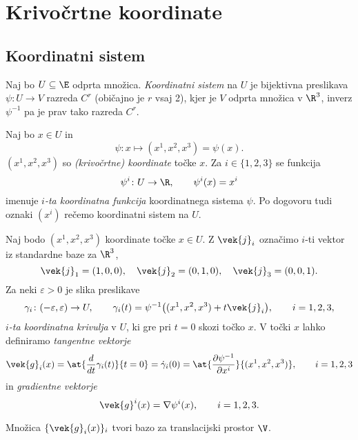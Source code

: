 \section{Krivočrtne koordinate} \label{s:koordinate}


\subsection{Koordinatni sistem}


\begin{definicija}
	Naj bo $U\subseteq\E$ odprta množica. \emph{Koordinatni sistem} na $U$ je bijektivna
	preslikava $\psi\colon U\to V$ razreda $C^r$ (običajno je $r$ vsaj 2), kjer je $V$ odprta
	množica v $\R^3$, inverz $\psi^{-1}$ pa je prav tako razreda $C^r$.
\end{definicija}

Naj bo $x\in U$ in
\[ \psi\colon x\mapsto (x^1,x^2,x^3)=\psi(x). \]
$(x^1,x^2,x^3)$ so \emph{(krivočrtne) koordinate} točke $x$.
Za $i\in\{1,2,3\}$ se funkcija
\[ \psi^i\colon U\to\R,\qquad \psi^i(x)=x^i \]
imenuje \emph{$i$-ta koordinatna funkcija} koordinatnega sistema $\psi$.
Po dogovoru tudi oznaki $(x^i)$ rečemo koordinatni sistem na $U$.

Naj bodo $(x^1,x^2,x^3)$ koordinate točke $x\in U$. Z $\vek{j}_i$ označimo
$i$-ti vektor iz standardne baze za $\R^3$,
\[ \vek{j}_1=(1,0,0),\quad\vek{j}_2=(0,1,0),\quad\vek{j}_3=(0,0,1). \]
Za neki $\varepsilon>0$ je slika preslikave
\begin{equation} \label{e:kokri}
	\gamma_i\colon(-\varepsilon,\varepsilon)\to U,\qquad
	\gamma_i(t)=\psi^{-1}\big((x^1,x^2,x^3)+t\vek{j}_i\big),\qquad i=1,2,3,
\end{equation}
\emph{$i$-ta koordinatna krivulja} v $U$, ki gre pri $t=0$ skozi točko $x$.
V točki $x$ lahko definiramo \emph{tangentne vektorje}
\begin{equation} \label{e:tanvek}
	\vek{g}_i(x)=\at{\frac{d}{dt}\gamma_i(t)}{t=0}=\dot{\gamma}_i(0)
	=\at{\frac{\partial\psi^{-1}}{\partial x^i}}{(x^1,x^2,x^3)}
	, \qquad i=1,2,3
\end{equation}
in \emph{gradientne vektorje}
\begin{equation} \label{e:gradvek}
	\vek{g}^i(x)=\nabla\psi^i(x),\qquad i=1,2,3.
\end{equation}

\begin{trditev}
	Množica $\{\vek{g}_i(x)\}_i$ tvori bazo za translacijski prostor $\V$.
\end{trditev}

